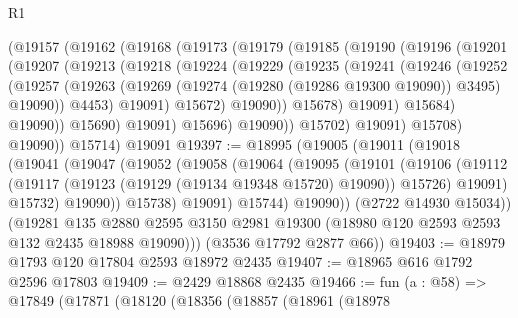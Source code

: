 \begin{lexlean}{R1}
\begin{coremodule}
        (@19157
          (@19162
            (@19168
              (@19173
                (@19179
                  (@19185
                    (@19190
                      (@19196
                        (@19201
                          (@19207
                            (@19213
                              (@19218
                                (@19224
                                  (@19229
                                    (@19235
                                      (@19241
                                        (@19246
                                          (@19252
                                            (@19257
                                              (@19263
                                                (@19269
                                                  (@19274 (@19280 (@19286 @19300 @19090)) @3495)
                                                  @19090))
                                              @4453)
                                            @19091)
                                          @15672)
                                        @19090))
                                    @15678)
                                  @19091)
                                @15684)
                              @19090))
                          @15690)
                        @19091)
                      @15696)
                    @19090))
                @15702)
              @19091)
            @15708)
          @19090))
      @15714)
    @19091
@19397 := @18995
    (@19005
      (@19011
        (@19018
          (@19041
            (@19047
              (@19052
                (@19058
                  (@19064
                    (@19095
                      (@19101
                        (@19106
                          (@19112
                            (@19117 (@19123 (@19129 (@19134 @19348 @15720) @19090)) @15726)
                            @19091)
                          @15732)
                        @19090))
                    @15738)
                  @19091)
                @15744)
              @19090))
          (@2722 @14930 @15034))
        (@19281
          @135
          @2880
          @2595
          @3150
          @2981
          @19300
          (@18980 @120 @2593 @2593 @132 @2435 @18988 @19090)))
      (@3536 @17792 @2877 @66))
@19403 := @18979 @1793 @120 @17804 @2593 @18972 @2435
@19407 := @18965 @616 @1792 @2596 @17803
@19409 := @2429 @18868 @2435
@19466 := fun (a : @58) =>
  @17849
    (@17871
      (@18120
        (@18356
          (@18857
            (@18961
              (@18978

\end{coremodule}
\end{lexlean}
